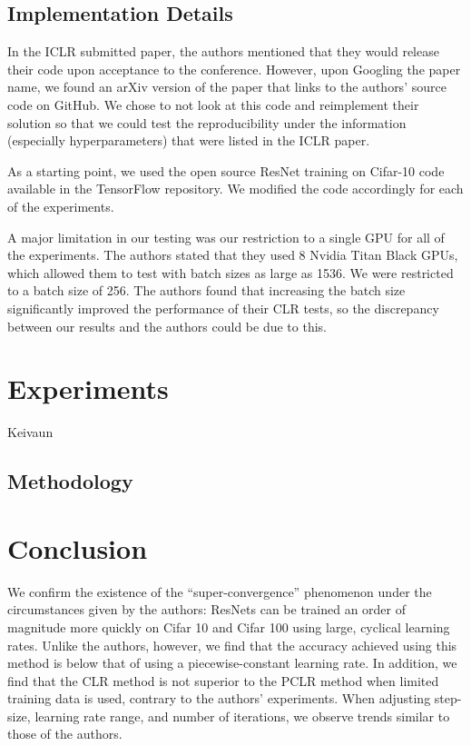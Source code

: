 \documentclass[10pt,twocolumn,letterpaper]{article}
\begin{document}
\subsection{Implementation Details}
In the ICLR submitted paper, the authors mentioned that they would release
their code upon acceptance to the conference. However, upon Googling the paper
name, we found an arXiv version of the paper that links to the authors' source
code on GitHub. We chose to not look at this code and reimplement their
solution so that we could test the reproducibility under the information
(especially hyperparameters) that were listed in the ICLR paper.

As a starting point, we used the open source ResNet training on Cifar-10 code
available in the TensorFlow \cite{TensorFlow} repository. We modified the code
accordingly for each of the experiments.

A major limitation in our testing was our restriction to a single GPU for all of the experiments. The authors stated that they used 8 Nvidia Titan Black GPUs, which allowed them to test with batch sizes as large as 1536. We were restricted to a batch size of 256. The authors found that increasing the batch size significantly improved the performance of their CLR tests, so the discrepancy between our results and the authors could be due to this.


\section{Experiments}
Keivaun
\subsection{Methodology}

\section{Conclusion}
\label{sec:conclusion}
We confirm the existence of the ``super-convergence'' phenomenon under the
circumstances given by the authors: ResNets can be trained an order of
magnitude more quickly on Cifar 10 and Cifar 100 using large, cyclical learning
rates. Unlike the authors, however, we find that the accuracy achieved using
this method is below that of using a piecewise-constant learning rate. In
addition, we find that the CLR method is not superior to the PCLR method when
limited training data is used, contrary to the authors' experiments. When
adjusting step-size, learning rate range, and number of iterations, we observe
trends similar to those of the authors.
\end{document}
